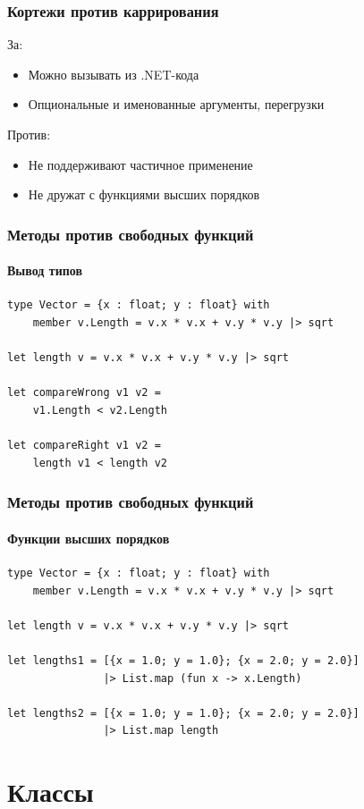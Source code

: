 \documentclass{../../slides-style}
\begin{document}
    \begin{frame}
        \frametitle{Кортежи против каррирования}
        За:
        \begin{itemize}
            \item Можно вызывать из .NET-кода
            \item Опциональные и именованные аргументы, перегрузки
        \end{itemize}
        Против:
        \begin{itemize}
            \item Не поддерживают частичное применение
            \item Не дружат с функциями высших порядков
        \end{itemize}
    \end{frame}

    \begin{frame}[fragile]
        \frametitle{Методы против свободных функций}
        \framesubtitle{Вывод типов}
        \begin{verbatim}
type Vector = {x : float; y : float} with
    member v.Length = v.x * v.x + v.y * v.y |> sqrt
   
let length v = v.x * v.x + v.y * v.y |> sqrt

let compareWrong v1 v2 =
    v1.Length < v2.Length

let compareRight v1 v2 =
    length v1 < length v2
        \end{verbatim}
    \end{frame}

    \begin{frame}[fragile]
        \frametitle{Методы против свободных функций}
        \framesubtitle{Функции высших порядков}
        \begin{verbatim}
type Vector = {x : float; y : float} with
    member v.Length = v.x * v.x + v.y * v.y |> sqrt

let length v = v.x * v.x + v.y * v.y |> sqrt

let lengths1 = [{x = 1.0; y = 1.0}; {x = 2.0; y = 2.0}]
               |> List.map (fun x -> x.Length)

let lengths2 = [{x = 1.0; y = 1.0}; {x = 2.0; y = 2.0}]
               |> List.map length
        \end{verbatim}
    \end{frame}

    \section{Классы}
 
\end{document}
